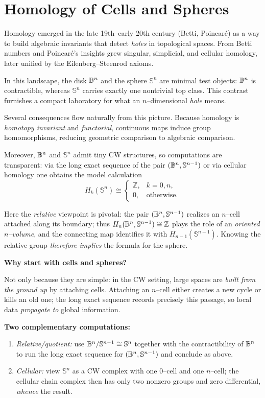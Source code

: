 \section{Homology of Cells and Spheres}
\begin{remark}\label{remark 2.1}
Homology emerged in the late 19th–early 20th century (Betti, Poincar\'e) as a way to build algebraic invariants that detect \emph{holes} in topological spaces. From Betti numbers and Poincar\'e’s insights grew singular, simplicial, and cellular homology, later unified by the Eilenberg--Steenrod axioms.

In this landscape, the disk $\mathbb{B}^n$ and the sphere $\mathbb{S}^n$ are minimal test objects: $\mathbb{B}^n$ is contractible, whereas $\mathbb{S}^n$ carries exactly one nontrivial top class. This contrast furnishes a compact laboratory for what an $n$–dimensional \emph{hole} means.

Several consequences flow naturally from this picture. Because homology is \emph{homotopy invariant} and \emph{functorial}, continuous maps induce group homomorphisms, reducing geometric comparison to algebraic comparison.

Moreover, $\mathbb{B}^n$ and $\mathbb{S}^n$ admit tiny CW structures, so computations are transparent: via the long exact sequence of the pair $(\mathbb{B}^n,\mathbb{S}^{n-1})$ or via cellular homology one obtains the model calculation
\[
H_k(\mathbb{S}^n)\cong
\begin{cases}
\mathbb{Z},& k=0,n,\\
0,& \text{otherwise}.
\end{cases}
\]

Here the \emph{relative} viewpoint is pivotal: the pair $(\mathbb{B}^n,\mathbb{S}^{n-1})$ realizes an $n$–cell attached along its boundary; thus $H_n(\mathbb{B}^n,\mathbb{S}^{n-1})\cong\mathbb{Z}$ plays the role of an \emph{oriented $n$–volume}, and the connecting map identifies it with $H_{n-1}(\mathbb{S}^{n-1})$. Knowing the relative group \emph{therefore implies} the formula for the sphere.

\textbf{Why start with cells and spheres?}

Not only because they are simple: in the CW setting, large spaces are \emph{built from the ground up} by attaching cells. Attaching an $n$–cell either creates a new cycle or kills an old one; the long exact sequence records precisely this passage, so local data \emph{propagate to} global information.

\textbf{Two complementary computations:}
\begin{enumerate}
    \item \emph{Relative/quotient:} use $\mathbb{B}^n/\mathbb{S}^{n-1}\cong \mathbb{S}^n$ together with the contractibility of $\mathbb{B}^n$ to run the long exact sequence for $(\mathbb{B}^n,\mathbb{S}^{n-1})$ and conclude as above.
    \item \emph{Cellular:} view $\mathbb{S}^n$ as a CW complex with one $0$–cell and one $n$–cell; the cellular chain complex then has only two nonzero groups and zero differential, \emph{whence} the result.
\end{enumerate}


\end{remark}
